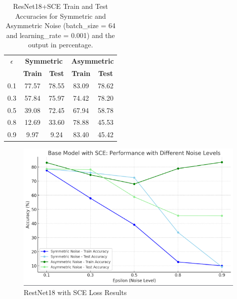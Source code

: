 \documentclass[11pt,twocolumn,letterpaper]{article}
\begin{document}
\begin{table}[h]
\centering
\begin{tabular}{|c|c|c|c|c|}
\hline
\textbf{\(\epsilon\)} & \multicolumn{2}{c|}{\textbf{Symmetric}} & \multicolumn{2}{c|}{\textbf{Asymmetric}} \\
\cline{2-5}
 & \textbf{Train} & \textbf{Test} & \textbf{Train} & \textbf{Test} \\
\hline
0.1 & 77.57 & 78.55 & 83.09 & 78.62 \\
\hline
0.3 & 57.84 & 75.97 & 74.42 & 78.20 \\
\hline
0.5 & 39.08 & 72.45 & 67.94 & 58.78 \\
\hline
0.8 & 12.69 & 33.60 & 78.88 & 45.53 \\
\hline
0.9 & 9.97 & 9.24 & 83.40 & 45.42 \\
\hline
\end{tabular}
\caption{ResNet18+SCE Train and Test Accuracies for Symmetric and Asymmetric Noise (batch\_size = 64 and learning\_rate = 0.001) and the output in percentage.}
\label{tab:mergedAccuracySCE}
\end{table}

\begin{figure}[ht]
    \centering
    \includegraphics[width=1\linewidth, trim={0 10pt 0 0}, clip]{SCEResults.png}
    \caption{RestNet18 with SCE Loss Results}
    \label{fig:SCEResults}
\end{figure}
\end{document}
